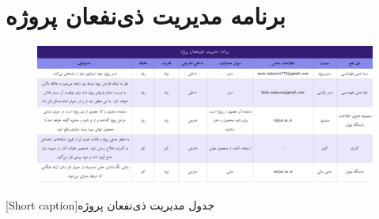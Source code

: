 \section{
برنامه مدیریت ذی‌نفعان پروژه
}

\begin{center}
  \begin{figure} [h!]
    { \includegraphics[page=1, width=\textwidth]{appandecies/benefactors.pdf}}
  \end{figure}
  [Short caption]{جدول مدیریت ذی‌نفعان پروژه}
\end{center}